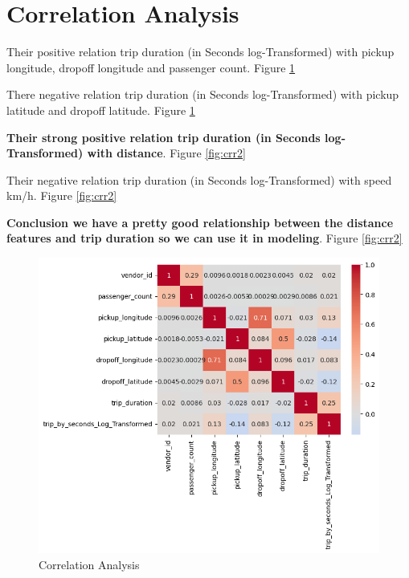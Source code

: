 \section{Correlation Analysis}

\hfill \break
Their positive relation trip duration (in Seconds log-Transformed) with pickup longitude, dropoff longitude and passenger count. Figure \ref{fig:crr}

\hfill \break
There negative relation trip duration (in Seconds log-Transformed) with pickup latitude and dropoff latitude. Figure \ref{fig:crr}

\hfill \break
\textbf{Their strong positive relation trip duration (in Seconds log-Transformed) with distance}. Figure \ref{fig:crr2}

\hfill \break
Their negative relation trip duration (in Seconds log-Transformed) with speed km/h. Figure \ref{fig:crr2}

\hfill \break
\textbf{Conclusion we have a pretty good relationship between the distance features and trip duration so we can use it in modeling}. Figure \ref{fig:crr2}


\begin{figure}[ht]
\centering
    \includegraphics[width=1\linewidth]{crr.png}
    \caption{\label{fig:crr} Correlation Analysis}
\end{figure}

